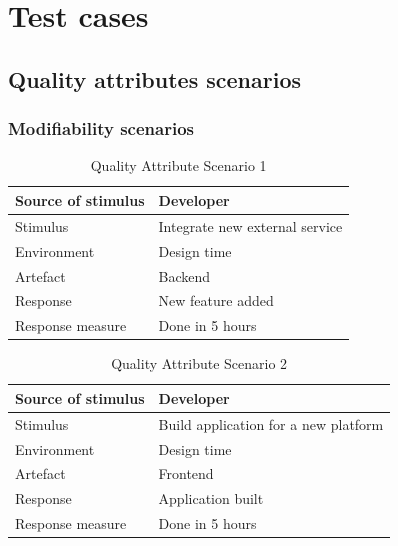 \documentclass[11pt]{book}
\begin{document}
\section{Test cases} \label{sec:test_cases}

\subsection{Quality attributes scenarios}

\subsubsection{Modifiability scenarios}

\begin{table}[H]
  \centering
  \begin{tabular}{| l | p{11cm} |} \hline
    Source of stimulus   & Developer                                   \\ \hline
    Stimulus             & Integrate new external service              \\ \hline
    Environment          & Design time                                 \\ \hline
    Artefact             & Backend                                     \\ \hline
    Response             & New feature added                           \\ \hline
    Response measure     & Done in 5 hours                             \\ \hline
  \end{tabular}
  \caption{Quality Attribute Scenario 1}
  \label{tab:qas_newservice}
\end{table}

\begin{table}[H]
  \centering
  \begin{tabular}{| l | p{11cm} |} \hline
    Source of stimulus   & Developer                                   \\ \hline
    Stimulus             & Build application for a new platform        \\ \hline
    Environment          & Design time                                 \\ \hline
    Artefact             & Frontend                                    \\ \hline
    Response             & Application built                           \\ \hline
    Response measure     & Done in 5 hours                             \\ \hline
  \end{tabular}
  \caption{Quality Attribute Scenario 2}
  \label{tab:TC_qas_newplatform}
\end{table}
\end{document}
